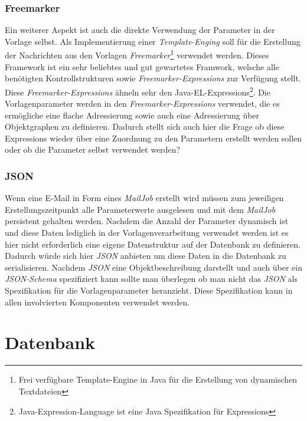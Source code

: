 \subsection{Freemarker}
\label{sec:template-parameter-freemarker}
Ein weiterer Aspekt ist auch die direkte Verwendung der Parameter in der Vorlage selbst. Als Implementierung einer \emph{Template-Enging} soll für die Erstellung der Nachrichten aus den Vorlagen \emph{Freemarker}\footnote{\label{fn:freemarker}Frei verfügbare Template-Engine in Java für die Erstellung von dynamischen Textdateien} verwendet werden. Dieses Framework ist ein sehr beliebtes und gut gewartetes Framwork, welsche alle benötigten Kontrollstrukturen sowie \emph{Freemarker-Expressions} zur Verfügung stellt. Diese \emph{Freemarker-Expressions} ähneln sehr den Java-EL-Expressions\footnote{Java-Expression-Language ist eine Java Spezifikation für Expressions}. 
Die Vorlagenparameter werden in den \emph{Freemarker-Expressions} verwendet, die es ermögliche eine flache Adressierung sowie auch eine Adressierung über Objektgraphen zu definieren. Dadurch stellt sich auch hier die Frage ob diese Expressions wieder über eine Zuordnung zu den Parametern erstellt werden sollen oder ob die Parameter selbst verwendet werden?
\subsection{JSON}
\label{sec:template-parameter-json}
Wenn eine E-Mail in Form eines \emph{MailJob} erstellt wird müssen zum jeweiligen Erstellungszeitpunkt alle Parameterwerte ausgelesen und mit dem \emph{MailJob} persistent gehalten werden. Nachdem die Anzahl der Parameter dynamisch ist und diese Daten lediglich in der Vorlagenverarbeitung verwendet werden ist es hier nicht erforderlich eine eigene Datenstruktur auf der Datenbank zu definieren. Dadurch würde sich hier \emph{JSON} anbieten um diese Daten in die Datenbank zu serialisieren. Nachdem \emph{JSON} eine Objektbeschreibung darstellt und auch über ein \emph{JSON-Schema} spezifiziert kann sollte man überlegen ob man nicht das \emph{JSON} als Spezifikation für die Vorlagenparameter heranzieht. Diese Spezifikation kann in allen involvierten Komponenten verwendet werden. 
\newpage
\chapter{Datenbank}
